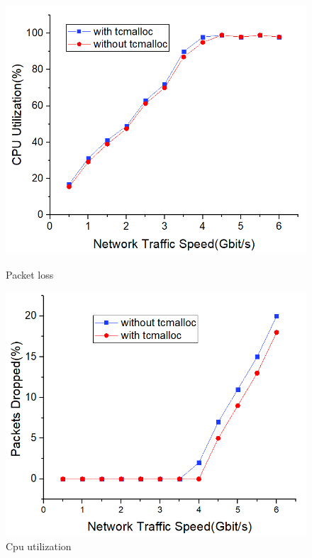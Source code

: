 \documentclass[conference]{IEEEtran}
\begin{document}
\begin{figure}
\begin{minipage}[t]{0.49\linewidth}
\flushleft
\includegraphics[width=\textwidth]{./picture/Figure12.jpg}
\caption{Packet loss} 
\label{fig:13}
\end{minipage}
\begin{minipage}[t]{0.49\linewidth}
\flushright
\includegraphics[width=\textwidth]{./picture/Figure13.jpg}
\caption{Cpu utilization}
\label{fig:14}
\end{minipage}
\end{figure} 
\end{document}
